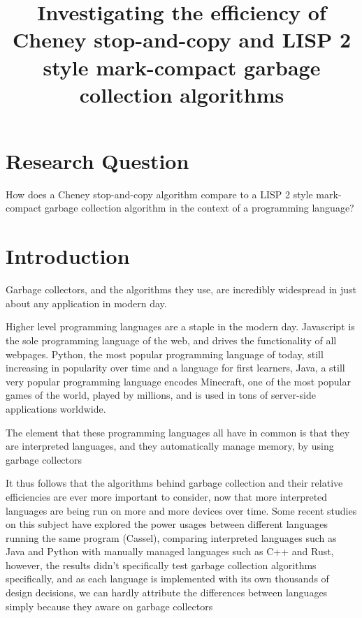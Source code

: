 \documentclass[index]{subfiles}
\begin{document}
\title{Investigating the efficiency of Cheney stop-and-copy and LISP 2 style mark-compact garbage collection algorithms}
\date{}
\author{}
\maketitle

\section{Research Question}

How does a Cheney stop-and-copy algorithm compare to a LISP 2 style mark-compact garbage collection algorithm in the context of a programming language?

\section{Introduction}

Garbage collectors, and the algorithms they use, are incredibly widespread in just about any application in modern day.

Higher level programming languages are a staple in the modern day. Javascript is the sole programming language of the web, and drives the functionality of all webpages. Python, the most popular programming language of today, still increasing in popularity over time and a language for first learners, Java, a still very popular programming language encodes Minecraft, one of the most popular games of the world, played by millions, and is used in tons of server-side applications worldwide.

The element that these programming languages all have in common is that they are interpreted languages, and they automatically manage memory, by using garbage collectors

It thus follows that the algorithms behind garbage collection and their relative efficiencies are ever more important to consider, now that more interpreted languages are being run on more and more devices over time. Some recent studies on this subject have explored the power usages between different languages running the same program (Cassel), comparing interpreted languages such as Java and Python with manually managed languages such as C++ and Rust, however, the results didn't specifically test garbage collection algorithms specifically, and as each language is implemented with its own thousands of design decisions, we can hardly attribute the differences between languages simply because they aware on garbage collectors
\end{document}
